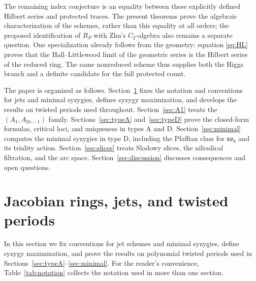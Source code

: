 \documentclass[10pt,reqno]{amsart}
\numberwithin{equation}{section}
\theoremstyle{plain}
\theoremstyle{definition}
\begin{document}
The remaining index conjecture is an equality between these explicitly defined Hilbert series and protected traces. The present theorems prove the algebraic characterization of the schemes, rather than this equality at all orders; the proposed identification of $R_P$ with Zhu's $C_2$-algebra \cite{Zhu} also remains a separate question. One specialization already follows from the geometry: equation \eqref{eq:HL} proves that the Hall--Littlewood limit of the geometric series is the Hilbert series of the reduced ring. The same nonreduced scheme thus supplies both the Higgs branch and a definite candidate for the full protected count.

The paper is organized as follows. Section~\ref{sec:prelim} fixes the notation and conventions for jets and minimal syzygies, defines syzygy maximization, and develops the results on twisted periods used throughout. Section~\ref{sec:A1} treats the $(A_1,A_{2n-1})$ family. Sections~\ref{sec:typeA} and~\ref{sec:typeD} prove the closed-form formulas, critical loci, and uniqueness in types A and D. Section~\ref{sec:minimal} computes the minimal syzygies in type D, including the Pfaffian class for $\mathfrak{so}_8$ and its triality action. Section~\ref{sec:slices} treats Slodowy slices, the nilradical filtration, and the arc space. Section~\ref{sec:discussion} discusses consequences and open questions.

\section{Jacobian rings, jets, and twisted periods}\label{sec:prelim}

In this section we fix conventions for jet schemes and minimal syzygies, define syzygy maximization, and prove the results on polynomial twisted periods used in Sections~\ref{sec:typeA}--\ref{sec:minimal}. For the reader's convenience, Table~\ref{tab:notation} collects the notation used in more than one section.
\end{document}

